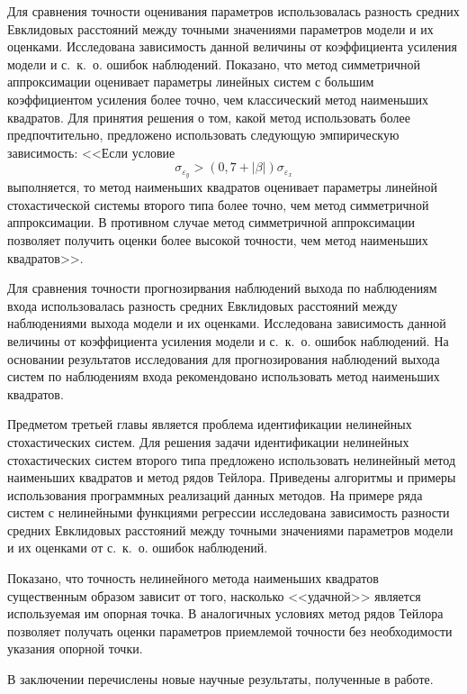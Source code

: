 Для сравнения точности оценивания параметров использовалась разность средних
Евклидовых расстояний между точными значениями параметров модели и их оценками.
Исследована зависимость данной величины от коэффициента усиления модели и
с.~к.~о. ошибок наблюдений.
Показано, что метод симметричной аппроксимации оценивает
параметры линейных систем с большим коэффициентом усиления более точно,
чем классический метод наименьших квадратов.
Для принятия решения о том, какой метод использовать более предпочтительно,
предложено использовать следующую эмпирическую зависимость:
<<Если условие
\begin{equation*}
  \sigma_{\varepsilon_y} > (0{,}7 + |\beta|) \sigma_{\varepsilon_x}
\end{equation*}
выполняется, то метод наименьших квадратов оценивает параметры линейной
стохастической системы второго типа более точно, чем метод симметричной аппроксимации.
В противном случае метод симметричной аппроксимации позволяет получить
оценки более высокой точности, чем метод наименьших квадратов>>.

Для сравнения точности прогнозирвания наблюдений выхода по наблюдениям входа
использовалась разность средних Евклидовых расстояний между наблюдениями выхода
модели и их оценками.
Исследована зависимость данной величины от коэффициента усиления модели и
с.~к.~о. ошибок наблюдений.
На основании результатов исследования для прогнозирования наблюдений выхода
систем по наблюдениям входа рекомендовано использовать метод наименьших квадратов.

Предметом третьей главы является проблема идентификации нелинейных стохастических систем.
Для решения задачи идентификации нелинейных стохастических систем второго типа
предложено использовать нелинейный метод наименьших квадратов и метод рядов Тейлора.
Приведены алгоритмы и примеры использования программных реализаций данных методов.
На примере ряда систем с нелинейными функциями регрессии исследована зависимость разности
средних Евклидовых расстояний между точными значениями параметров модели и их оценками
от с.~к.~о. ошибок наблюдений.

Показано, что точность нелинейного метода наименьших квадратов существенным образом
зависит от того, насколько <<удачной>> является используемая им опорная точка.
В аналогичных условиях метод рядов Тейлора позволяет получать оценки параметров
приемлемой точности без необходимости указания опорной точки.

В заключении перечислены новые научные результаты, полученные в работе.

